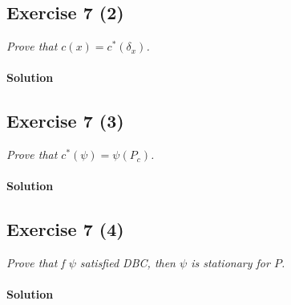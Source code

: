 \subsection*{Exercise 7 (2)}
\textit{Prove that $ c(x) = c^{*}(\delta_{x}) $.}

\paragraph{Solution}


\subsection*{Exercise 7 (3)}
\textit{Prove that $ c^{*}(\psi) = \psi(P_{c}) $.}

\paragraph{Solution}


\subsection*{Exercise 7 (4)}
\textit{Prove that f $ \psi $ satisfied DBC, then $ \psi $ is stationary for $ P $.}

\paragraph{Solution}